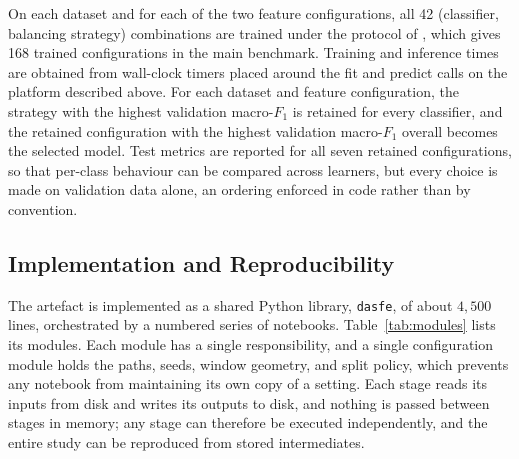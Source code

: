 On each dataset and for each of the two feature configurations, all 42 (classifier, balancing strategy) combinations are trained under the protocol of , which gives 168 trained configurations in the main benchmark. Training and inference times are obtained from wall-clock timers placed around the fit and predict calls on the platform described above. For each dataset and feature configuration, the strategy with the highest validation macro-$F_1$ is retained for every classifier, and the retained configuration with the highest validation macro-$F_1$ overall becomes the selected model. Test metrics are reported for all seven retained configurations, so that per-class behaviour can be compared across learners, but every choice is made on validation data alone, an ordering enforced in code rather than by convention.

\subsection{Implementation and Reproducibility}
\label{sec:chap3Implementation}
The artefact is implemented as a shared Python library, \texttt{dasfe}, of about $4{,}500$ lines, orchestrated by a numbered series of notebooks. Table~\ref{tab:modules} lists its modules. Each module has a single responsibility, and a single configuration module holds the paths, seeds, window geometry, and split policy, which prevents any notebook from maintaining its own copy of a setting. Each stage reads its inputs from disk and writes its outputs to disk, and nothing is passed between stages in memory; any stage can therefore be executed independently, and the entire study can be reproduced from stored intermediates.

